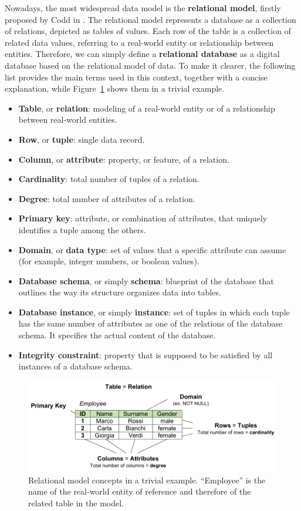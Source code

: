 Nowadays, the most widespread data model is the \textbf{relational model}, firstly proposed by Codd in \cite{codd1970relational}. The relational model represents a database as a collection of relations, depicted as tables of values. Each row of the table is a collection of related data values, referring to a real-world entity or relationship between entities. Therefore, we can simply define a \textbf{relational database} as a digital database based on the relational model of data.
To make it clearer, the following list provides the main terms used in this context, together with a concise explanation, while Figure~\ref{fig:relational_model} shows them in a trivial example.
\begin{itemize}
\item \textbf{Table}, or \textbf{relation}: modeling of a real-world entity or of a relationship between real-world entities.
\item \textbf{Row}, or \textbf{tuple}: single data record.
\item \textbf{Column}, or \textbf{attribute}: property, or feature, of a relation.
\item \textbf{Cardinality}: total number of tuples of a relation.
\item \textbf{Degree}: total number of attributes of a relation.
\item \textbf{Primary key}: attribute, or combination of attributes, that uniquely identifies a tuple among the others.
\item \textbf{Domain}, or \textbf{data type}: set of values that a specific attribute can assume (for example, integer numbers, or boolean values).
\item \textbf{Database schema}, or simply \textbf{schema}: blueprint of the database that outlines the way its structure organizes data into tables.
\item \textbf{Database instance}, or simply \textbf{instance}: set of tuples in which each tuple has the same number of attributes as one of the relations of the database schema. It specifies the actual content of the database.
\item \textbf{Integrity constraint}: property that is supposed to be satisfied by all instances of a database schema.
\end{itemize} 

\begin{figure}[t!]
\includegraphics[scale=.75]{figures/relational_model.pdf}
\centering
\caption{Relational model concepts in a trivial example. ``Employee'' is the name of the real-world entity of reference and therefore of the related table in the model.}
\label{fig:relational_model}
\end{figure}


